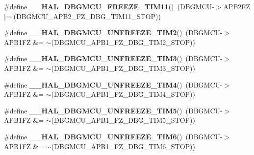 \begin{DoxyCompactItemize}
\mbox{\label{group___h_a_l___exported___macros_gac1f554993a6d5c7a953dab2c6cc564dd}} 
\#define {\bfseries \+\_\+\+\_\+\+H\+A\+L\+\_\+\+D\+B\+G\+M\+C\+U\+\_\+\+F\+R\+E\+E\+Z\+E\+\_\+\+T\+I\+M11}()~(D\+B\+G\+M\+CU-\/$>$A\+P\+B2\+FZ $\vert$= (D\+B\+G\+M\+C\+U\+\_\+\+A\+P\+B2\+\_\+\+F\+Z\+\_\+\+D\+B\+G\+\_\+\+T\+I\+M11\+\_\+\+S\+T\+OP))
\item 
\mbox{\label{group___h_a_l___exported___macros_gafd40134436233985a840e1cd8eb6c4c3}} 
\#define {\bfseries \+\_\+\+\_\+\+H\+A\+L\+\_\+\+D\+B\+G\+M\+C\+U\+\_\+\+U\+N\+F\+R\+E\+E\+Z\+E\+\_\+\+T\+I\+M2}()~(D\+B\+G\+M\+CU-\/$>$A\+P\+B1\+FZ \&= $\sim$(D\+B\+G\+M\+C\+U\+\_\+\+A\+P\+B1\+\_\+\+F\+Z\+\_\+\+D\+B\+G\+\_\+\+T\+I\+M2\+\_\+\+S\+T\+OP))
\item 
\mbox{\label{group___h_a_l___exported___macros_ga5aecefa008a37ef7c6489a2e29415e69}} 
\#define {\bfseries \+\_\+\+\_\+\+H\+A\+L\+\_\+\+D\+B\+G\+M\+C\+U\+\_\+\+U\+N\+F\+R\+E\+E\+Z\+E\+\_\+\+T\+I\+M3}()~(D\+B\+G\+M\+CU-\/$>$A\+P\+B1\+FZ \&= $\sim$(D\+B\+G\+M\+C\+U\+\_\+\+A\+P\+B1\+\_\+\+F\+Z\+\_\+\+D\+B\+G\+\_\+\+T\+I\+M3\+\_\+\+S\+T\+OP))
\item 
\mbox{\label{group___h_a_l___exported___macros_gac73202fc9f0913f52ef70c42b6cab287}} 
\#define {\bfseries \+\_\+\+\_\+\+H\+A\+L\+\_\+\+D\+B\+G\+M\+C\+U\+\_\+\+U\+N\+F\+R\+E\+E\+Z\+E\+\_\+\+T\+I\+M4}()~(D\+B\+G\+M\+CU-\/$>$A\+P\+B1\+FZ \&= $\sim$(D\+B\+G\+M\+C\+U\+\_\+\+A\+P\+B1\+\_\+\+F\+Z\+\_\+\+D\+B\+G\+\_\+\+T\+I\+M4\+\_\+\+S\+T\+OP))
\item 
\mbox{\label{group___h_a_l___exported___macros_ga0669527789fb4616ec07ed711a600d04}} 
\#define {\bfseries \+\_\+\+\_\+\+H\+A\+L\+\_\+\+D\+B\+G\+M\+C\+U\+\_\+\+U\+N\+F\+R\+E\+E\+Z\+E\+\_\+\+T\+I\+M5}()~(D\+B\+G\+M\+CU-\/$>$A\+P\+B1\+FZ \&= $\sim$(D\+B\+G\+M\+C\+U\+\_\+\+A\+P\+B1\+\_\+\+F\+Z\+\_\+\+D\+B\+G\+\_\+\+T\+I\+M5\+\_\+\+S\+T\+OP))
\item 
\mbox{\label{group___h_a_l___exported___macros_gaab127b51706a565b72c397e29b145234}} 
\#define {\bfseries \+\_\+\+\_\+\+H\+A\+L\+\_\+\+D\+B\+G\+M\+C\+U\+\_\+\+U\+N\+F\+R\+E\+E\+Z\+E\+\_\+\+T\+I\+M6}()~(D\+B\+G\+M\+CU-\/$>$A\+P\+B1\+FZ \&= $\sim$(D\+B\+G\+M\+C\+U\+\_\+\+A\+P\+B1\+\_\+\+F\+Z\+\_\+\+D\+B\+G\+\_\+\+T\+I\+M6\+\_\+\+S\+T\+OP))

\end{DoxyCompactItemize}
